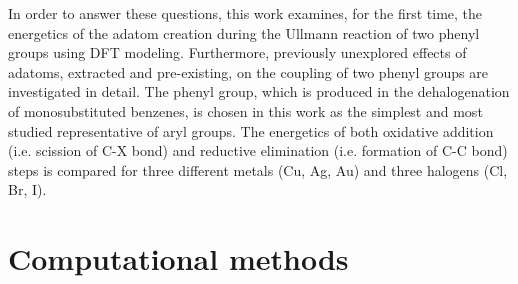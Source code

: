 \documentclass[aps,prb,reprint,amsmath,amssymb]{revtex4-1}
\newcommand{\lock}{\color{red}}
\newcommand{\lock}{\color{black}}
\begin{document}
{\lock

In order to answer these questions, this work examines, for the first time, the energetics of the adatom creation during the Ullmann reaction of two phenyl groups using DFT modeling. 
Furthermore, previously unexplored effects of adatoms, extracted and pre-existing, on the coupling of two phenyl groups are investigated in detail. 
The phenyl group, which is produced in the dehalogenation of monosubstituted benzenes, is chosen in this work as the simplest and most studied representative of aryl groups. The energetics of both oxidative addition (i.e. scission of C-X bond) and reductive elimination (i.e. formation of C-C bond) steps is compared for three different metals (Cu, Ag, Au) and three halogens (Cl, Br, I).




}

\section{Computational methods}
\end{document}
